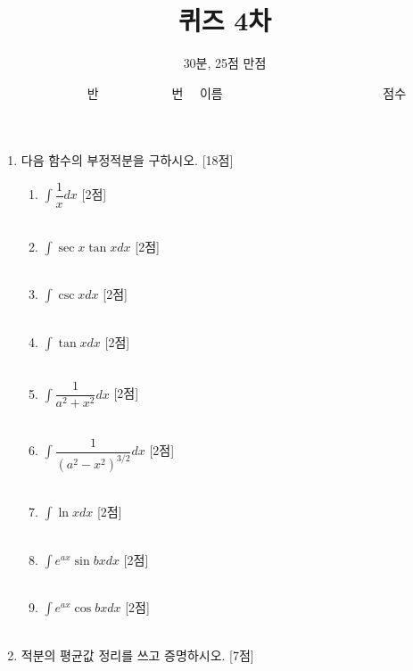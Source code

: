 \documentclass[12pt, a4paper]{article}
\title{퀴즈 4차}
\author{30분, 25점 만점}
\date{\ \ \ \ \ \ \ 반 \ \ \ \ \ \ \ \ \ \ \ 번 \ \ 이름 \ \ \ \ \ \ \ \ \ \ \ \ \ \ \ \ \ \ \ \ \ \ \ \ \ 점수}
\begin{document}
\maketitle 
\begin{enumerate}
    \item  다음 함수의 부정적분을 구하시오. [18점]
    \begin{enumerate}[label=(\arabic*)]
        \item $\displaystyle \int \dfrac{1}{x} dx$ [2점] \\ \\
        \item $\displaystyle \int \sec x \tan x dx$ [2점] \\ \\
        \item $\displaystyle \int \csc x dx$ [2점] \\ \\
        \item $\displaystyle \int \tan x dx$ [2점] \\ \\
        \item $\displaystyle \int \dfrac{1}{a^2 + x^2} dx$ [2점] \\ \\
        \item $\displaystyle \int \dfrac{1}{(a^2 - x^2)^{3/2}} dx$ [2점] \\ \\
        \item $\displaystyle \int \ln x dx$ [2점]\\ \\
        \item $\displaystyle \int e^{ax} \sin bx dx$ [2점]\\ \\
        \item $\displaystyle \int e^{ax} \cos bx dx$ [2점]\\ \\
    \end{enumerate}
    
    \newpage %
    \item 적분의 평균값 정리를 쓰고 증명하시오. [7점] \\ \\ \\ \\ \\ \\


\end{enumerate}
\end{document}
